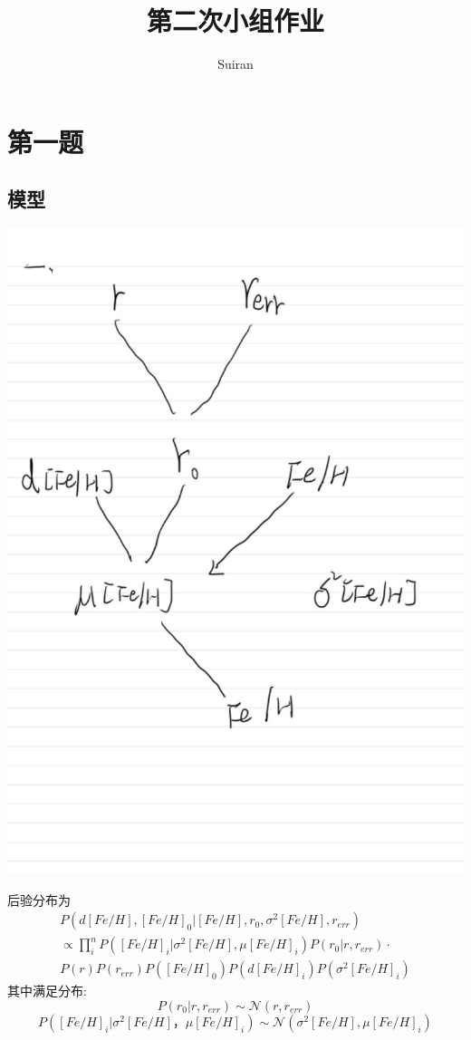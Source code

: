 \documentclass[12pt, letterpaper]{article}
\title{第二次小组作业}
\author{Suiran}
\begin{document}
\maketitle

\newpage
\section{第一题}
\subsection{模型}

\includegraphics[scale=0.333]{A.png}

后验分布为
\begin{equation}
\begin{split}
	P(d[Fe/H],[Fe/H]_0|[Fe/H], r_0, \sigma^2[Fe/H],r_{err})\\
	\propto \prod_i^nP([Fe/H]_i|\sigma^2[Fe/H], \mu[Fe/H]_i)P(r_0|r, r_{err})\cdot \\
	P(r)P(r_{err})P([Fe/H]_0)P(d[Fe/H]_i)P(\sigma^2[Fe/H]_i)	
\end{split}
\end{equation}
其中满足分布:
\begin{equation}
	P(r_0|r, r_{err})\sim \mathcal{N}(r,r_{err})
\end{equation}
\begin{equation}
	P([Fe/H]_i|\sigma^2[Fe/H]， \mu[Fe/H]_i)\sim \mathcal{N}(\sigma^2[Fe/H], \mu[Fe/H]_i)
\end{equation}
\end{document}
